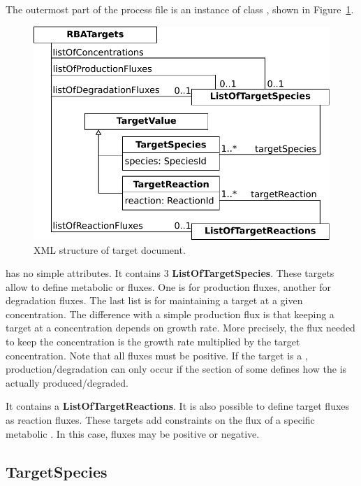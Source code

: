 The outermost part of the process file is an instance of class
\rbatargets, shown in Figure~\ref{fig:targets_doc}.

\begin{figure}
  \centering
  \includegraphics[scale=0.8]{figures/targets_doc}
  \caption{XML structure of target document.}
\label{fig:targets_doc}
\end{figure}

\rbatargets{} has no simple attributes.
It contains 3 \textbf{ListOfTargetSpecies}.
These targets allow to define metabolic \species{} or \macromolecule{} fluxes.
One is for production fluxes, another for degradation fluxes.
The last list is for maintaining a target at a given concentration.
The difference with a simple production flux is that keeping a target at a
concentration depends on growth rate.
More precisely, the flux needed to keep the concentration is
the growth rate multiplied by the target concentration.
Note that all fluxes must be positive.
If the target is a \macromolecule, production/degradation can only occur
if the \processings{} section of some \process{} defines how the
\macromolecule{} is actually produced/degraded.

It contains a \textbf{ListOfTargetReactions}.
It is also possible to define target fluxes as reaction fluxes.
These targets add constraints on the flux of a specific metabolic \reaction.
In this case, fluxes may be positive or negative.


\subsection{TargetSpecies}
\label{sec:target_species}

